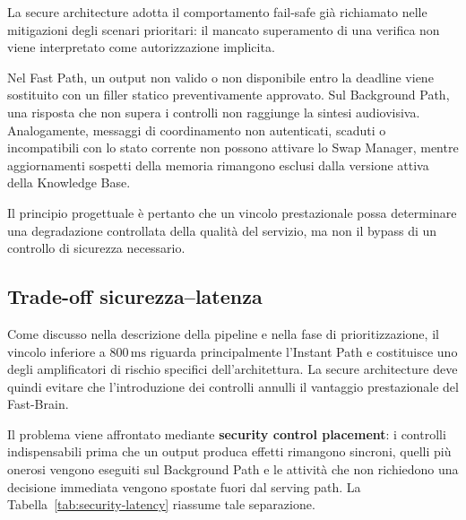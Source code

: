 \documentclass[11pt,a4paper]{article}
\begin{document}
La secure architecture adotta il comportamento fail-safe già
richiamato nelle mitigazioni degli scenari prioritari: il mancato
superamento di una verifica non viene interpretato come autorizzazione
implicita.

Nel Fast Path, un output non valido o non disponibile entro la deadline
viene sostituito con un filler statico preventivamente approvato. Sul
Background Path, una risposta che non supera i controlli non raggiunge
la sintesi audiovisiva. Analogamente, messaggi di coordinamento non
autenticati, scaduti o incompatibili con lo stato corrente non possono
attivare lo Swap Manager, mentre aggiornamenti sospetti della memoria
rimangono esclusi dalla versione attiva della Knowledge Base.

Il principio progettuale è pertanto che un vincolo prestazionale possa
determinare una degradazione controllata della qualità del servizio,
ma non il bypass di un controllo di sicurezza necessario.

\subsection{Trade-off sicurezza--latenza}
\label{sec:security-latency}

Come discusso nella descrizione della pipeline e nella fase di
prioritizzazione, il vincolo inferiore a $800\,\text{ms}$ riguarda
principalmente l'Instant Path e costituisce uno degli amplificatori di
rischio specifici dell'architettura. La secure architecture deve quindi
evitare che l'introduzione dei controlli annulli il vantaggio
prestazionale del Fast-Brain.

Il problema viene affrontato mediante \textbf{security control
placement}: i controlli indispensabili prima che un output produca
effetti rimangono sincroni, quelli più onerosi vengono eseguiti sul
Background Path e le attività che non richiedono una decisione
immediata vengono spostate fuori dal serving path. La
Tabella~\ref{tab:security-latency} riassume tale separazione.

\begingroup
\setlength{\tabcolsep}{4pt}
\footnotesize
\end{document}
